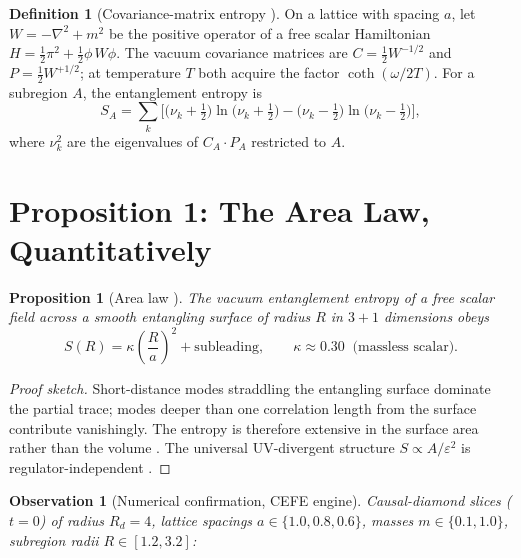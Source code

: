 \documentclass[11pt,a4paper]{article}
\newtheorem{proposition}{Proposition}
\newtheorem{observation}{Observation}
\theoremstyle{definition}
\newtheorem{definition}{Definition}
\theoremstyle{remark}
\begin{document}
\begin{definition}[Covariance-matrix entropy \cite{Srednicki1993,Bombelli1986}]
On a lattice with spacing $a$, let $W = -\nabla^2 + m^2$ be the positive
operator of a free scalar Hamiltonian
$H = \tfrac12\pi^2 + \tfrac12\phi\, W\phi$. The vacuum covariance matrices are
$C = \tfrac12 W^{-1/2}$ and $P = \tfrac12 W^{+1/2}$; at temperature $T$ both
acquire the factor $\coth(\omega/2T)$. For a subregion $A$, the entanglement
entropy is
\begin{equation}
S_A = \sum_k \Big[\big(\nu_k+\tfrac12\big)\ln\big(\nu_k+\tfrac12\big)
-\big(\nu_k-\tfrac12\big)\ln\big(\nu_k-\tfrac12\big)\Big],
\label{eq:srednicki}
\end{equation}
where $\nu_k^2$ are the eigenvalues of $C_A \cdot P_A$ restricted to $A$.
\end{definition}

\section{Proposition 1: The Area Law, Quantitatively}
\label{prop:area}

\begin{proposition}[Area law \cite{Srednicki1993,Bombelli1986,Plenio2005}]
The vacuum entanglement entropy of a free scalar field across a smooth
entangling surface of radius $R$ in $3{+}1$ dimensions obeys
\begin{equation}
S(R) = \kappa \left(\frac{R}{a}\right)^2 + \text{subleading},
\qquad \kappa \approx 0.30 \;\; \text{(massless scalar)}.
\end{equation}
\end{proposition}

\begin{proof}[Proof sketch]
Short-distance modes straddling the entangling surface dominate the partial
trace; modes deeper than one correlation length from the surface contribute
vanishingly. The entropy is therefore extensive in the surface area rather
than the volume \cite{Srednicki1993}. The universal UV-divergent structure
$S \propto A/\varepsilon^2$ is regulator-independent
\cite{Bombelli1986,CasiniHuerta2009}.
\end{proof}

\begin{observation}[Numerical confirmation, CEFE engine]
Causal-diamond slices ($t=0$) of radius $R_d = 4$, lattice spacings
$a \in \{1.0, 0.8, 0.6\}$, masses $m \in \{0.1, 1.0\}$, subregion radii
$R \in [1.2, 3.2]$:
\end{observation}
\end{document}
